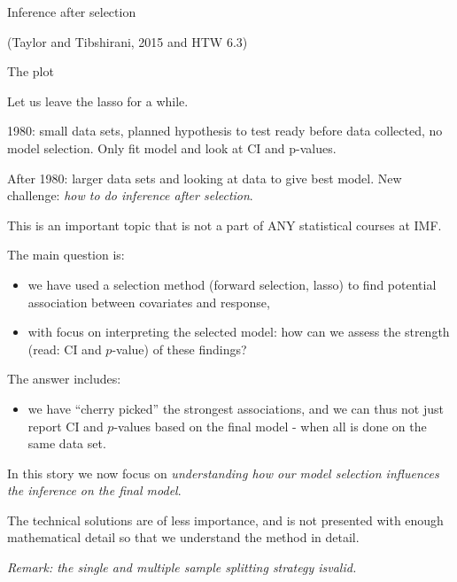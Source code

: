 \documentclass[
  ignorenonframetext,
]{beamer}
\providecommand{\tightlist}{%
  \setlength{\itemsep}{0pt}\setlength{\parskip}{0pt}}
\begin{document}
\begin{frame}{Inference after selection}
\protect\hypertarget{inference-after-selection}{}

(Taylor and Tibshirani, 2015 and HTW 6.3)

\begin{block}{The plot}

Let us leave the lasso for a while.

1980: small data sets, planned hypothesis to test ready before data
collected, no model selection. Only fit model and look at CI and
p-values.

After 1980: larger data sets and looking at data to give best model. New
challenge: \emph{how to do inference after selection}.

This is an important topic that is not a part of ANY statistical courses
at IMF.

The main question is:

\begin{itemize}
\tightlist
\item
  we have used a selection method (forward selection, lasso) to find
  potential association between covariates and response,
\item
  with focus on interpreting the selected model: how can we assess the
  strength (read: CI and \(p\)-value) of these findings?
\end{itemize}

\end{block}

\end{frame}

\begin{frame}

The answer includes:

\begin{itemize}
\tightlist
\item
  we have ``cherry picked'' the strongest associations, and we can thus
  not just report CI and \(p\)-values based on the final model - when
  all is done on the same data set.
\end{itemize}

In this story we now focus on \emph{understanding how our model
selection influences the inference on the final model}.

The technical solutions are of less importance, and is not presented
with enough mathematical detail so that we understand the method in
detail.

\emph{Remark: the single and multiple sample splitting strategy
isvalid.}

\end{frame}
\end{document}
